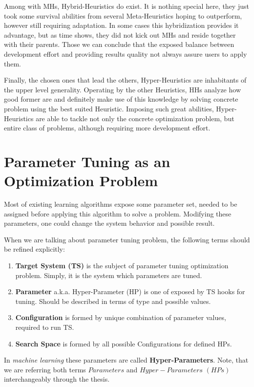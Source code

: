 Among with MHs, Hybrid-Heuristics do exist. It is nothing special here, they just took some survival abilities from several Meta-Heuristics hoping to outperform, however still requiring adaptation. In some cases this hybridization provides it advantage, but as time shows, they did not kick out MHs and reside together with their parents. Those we can conclude that the exposed balance between development effort and providing results quality not always assure users to apply them.

Finally, the chosen ones that lead the others, Hyper-Heuristics are inhabitants of the upper level generality. 
Operating by the other Heuristics, HHs analyze how good former are and definitely make use of this knowledge by solving concrete problem using the best suited Heuristic.
Imposing such great abilities, Hyper-Heuristics are able to tackle not only the concrete optimization problem, but entire class of problems, although requiring more development effort.


\section{Parameter Tuning as an Optimization Problem}\label{bg: parameter tuning}
Most of existing learning algorithms expose some parameter set, needed to be assigned before applying this algorithm to solve a problem. Modifying these parameters, one could change the system behavior and possible result.

When we are talking about parameter tuning problem, the following terms should be refined explicitly:
\begin{enumerate}
	\item \textbf{Target System (TS)} is the subject of parameter tuning optimization problem. Simply, it is the system which parameters are tuned.
	\item \textbf{Parameter} a.k.a. Hyper-Parameter (HP) is one of exposed by TS hooks for tuning. Should be described in terms of type and possible values.
	\item \textbf{Configuration} is formed by unique combination of parameter values, required to run TS.
	\item \textbf{Search Space} is formed by all possible Configurations for defined HPs.
\end{enumerate}

In \textit{machine learning} these parameters are called \textbf{Hyper-Parameters}. Note, that we are referring both terms $Parameters$ and $Hyper-Parameters$ $(HPs)$ interchangeably through the thesis.


